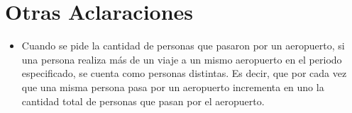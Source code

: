\section{Otras Aclaraciones}

\begin{itemize}
	\item Cuando se pide la cantidad de personas que pasaron por un aeropuerto, si una persona realiza más de un viaje a un mismo aeropuerto en el periodo especificado, se cuenta como personas distintas. Es decir, que por cada vez que una misma persona pasa por un aeropuerto incrementa en uno la cantidad total de personas que pasan por el aeropuerto.
	
\end{itemize}
